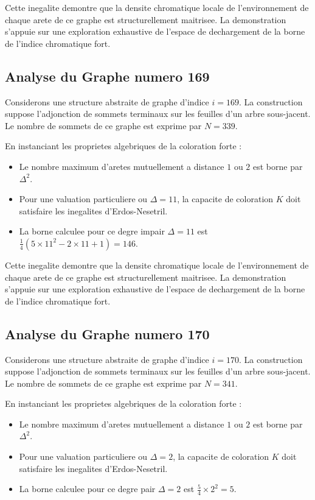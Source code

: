 \documentclass[11pt,a4paper]{article}
\begin{document}
Cette inegalite demontre que la densite chromatique locale de l'environnement de chaque arete de ce graphe est structurellement maitrisee. La demonstration s'appuie sur une exploration exhaustive de l'espace de dechargement de la borne de l'indice chromatique fort.

\subsection{Analyse du Graphe numero 169}
Considerons une structure abstraite de graphe d'indice $i = 169$. La construction suppose l'adjonction de sommets terminaux sur les feuilles d'un arbre sous-jacent. Le nombre de sommets de ce graphe est exprime par $N = 339$.

En instanciant les proprietes algebriques de la coloration forte :
\begin{itemize}
\item Le nombre maximum d'aretes mutuellement a distance $1$ ou $2$ est borne par $\Delta^2$.
\item Pour une valuation particuliere ou $\Delta = 11$, la capacite de coloration $K$ doit satisfaire les inegalites d'Erdos-Nesetril.
\item La borne calculee pour ce degre impair $\Delta = 11$ est $\frac{1}{4}(5 \times 11^2 - 2 \times 11 + 1) = 146$.
\end{itemize}

Cette inegalite demontre que la densite chromatique locale de l'environnement de chaque arete de ce graphe est structurellement maitrisee. La demonstration s'appuie sur une exploration exhaustive de l'espace de dechargement de la borne de l'indice chromatique fort.

\subsection{Analyse du Graphe numero 170}
Considerons une structure abstraite de graphe d'indice $i = 170$. La construction suppose l'adjonction de sommets terminaux sur les feuilles d'un arbre sous-jacent. Le nombre de sommets de ce graphe est exprime par $N = 341$.

En instanciant les proprietes algebriques de la coloration forte :
\begin{itemize}
\item Le nombre maximum d'aretes mutuellement a distance $1$ ou $2$ est borne par $\Delta^2$.
\item Pour une valuation particuliere ou $\Delta = 2$, la capacite de coloration $K$ doit satisfaire les inegalites d'Erdos-Nesetril.
\item La borne calculee pour ce degre pair $\Delta = 2$ est $\frac{5}{4} \times 2^2 = 5$.
\end{itemize}
\end{document}
